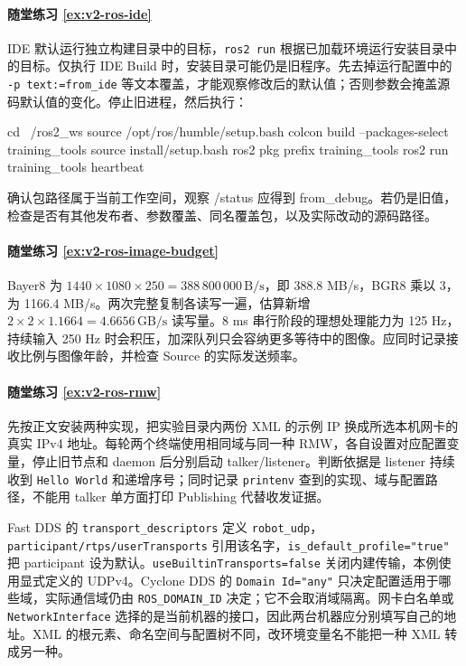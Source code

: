 \paragraph*{随堂练习 \ref{ex:v2-ros-ide}}
\begin{solution}
IDE 默认运行独立构建目录中的目标，\texttt{ros2 run} 根据已加载环境运行安装目录中的目标。仅执行 IDE Build 时，安装目录可能仍是旧程序。先去掉运行配置中的 \texttt{-p text:=from\_ide} 等文本覆盖，才能观察修改后的默认值；否则参数会掩盖源码默认值的变化。停止旧进程，然后执行：
\begin{tbash}
cd ~/ros2_ws
source /opt/ros/humble/setup.bash
colcon build --packages-select training_tools
source install/setup.bash
ros2 pkg prefix training_tools
ros2 run training_tools heartbeat
\end{tbash}
确认包路径属于当前工作空间，观察 /status 应得到 from\_debug。若仍是旧值，检查是否有其他发布者、参数覆盖、同名覆盖包，以及实际改动的源码路径。
\end{solution}

\paragraph*{随堂练习 \ref{ex:v2-ros-image-budget}}
\begin{solution}
Bayer8 为 $1440\times1080\times250=388\,800\,000\,\mathrm{B/s}$，即 388.8 MB/s，BGR8 乘以 3，为 1166.4 MB/s。两次完整复制各读写一遍，估算新增 $2\times2\times1.1664=4.6656\,\mathrm{GB/s}$ 读写量。8 ms 串行阶段的理想处理能力为 125 Hz，持续输入 250 Hz 时会积压，加深队列只会容纳更多等待中的图像。应同时记录接收比例与图像年龄，并检查 Source 的实际发送频率。
\end{solution}

\paragraph*{随堂练习 \ref{ex:v2-ros-rmw}}
\begin{solution}
先按正文安装两种实现，把实验目录内两份 XML 的示例 IP 换成所选本机网卡的真实 IPv4 地址。每轮两个终端使用相同域与同一种 RMW，各自设置对应配置变量，停止旧节点和 daemon 后分别启动 talker/listener。判断依据是 listener 持续收到 \texttt{Hello World} 和递增序号；同时记录 \texttt{printenv} 查到的实现、域与配置路径，不能用 talker 单方面打印 Publishing 代替收发证据。

Fast DDS 的 \texttt{transport\_descriptors} 定义 \texttt{robot\_udp}，\texttt{participant/rtps/userTransports} 引用该名字，\texttt{is\_default\_profile="true"} 把 participant 设为默认。\texttt{useBuiltinTransports=false} 关闭内建传输，本例使用显式定义的 UDPv4。Cyclone DDS 的 \texttt{Domain Id="any"} 只决定配置适用于哪些域，实际通信域仍由 \texttt{ROS\_DOMAIN\_ID} 决定；它不会取消域隔离。网卡白名单或 \texttt{NetworkInterface} 选择的是当前机器的接口，因此两台机器应分别填写自己的地址。XML 的根元素、命名空间与配置树不同，改环境变量名不能把一种 XML 转成另一种。
\end{solution}

